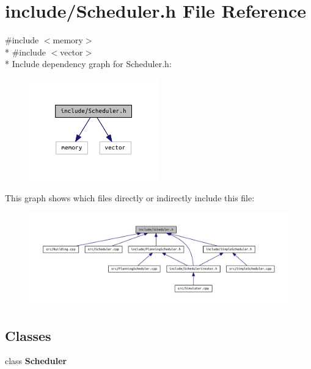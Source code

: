 \section{include/\+Scheduler.h File Reference}
\label{_scheduler_8h}
{\ttfamily \#include $<$memory$>$}\\*
{\ttfamily \#include $<$vector$>$}\\*
Include dependency graph for Scheduler.\+h\+:
\nopagebreak
\begin{figure}[H]
\begin{center}
\leavevmode
\includegraphics[width=158pt]{_scheduler_8h__incl}
\end{center}
\end{figure}
This graph shows which files directly or indirectly include this file\+:
\nopagebreak
\begin{figure}[H]
\begin{center}
\leavevmode
\includegraphics[width=350pt]{_scheduler_8h__dep__incl}
\end{center}
\end{figure}
\subsection*{Classes}
\begin{DoxyCompactItemize}
\item 
class {\bf Scheduler}
\end{DoxyCompactItemize}
